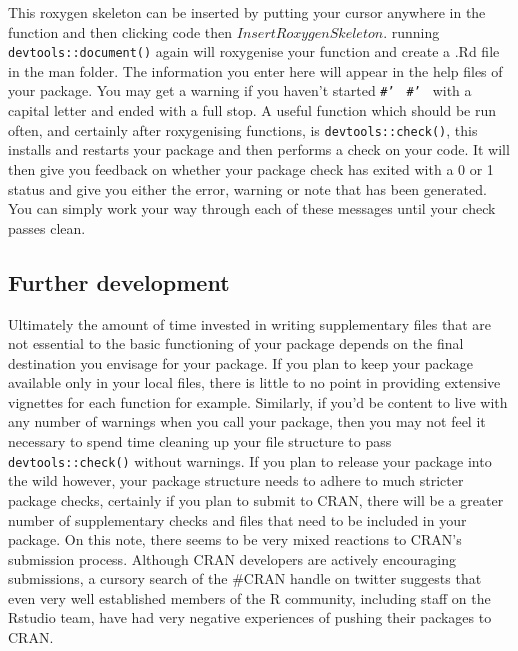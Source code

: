 \documentclass[a4paper,11pt]{article}
\begin{document}
This roxygen skeleton can be inserted by putting your cursor anywhere in the function and then clicking code then  $Insert Roxygen Skeleton $. running \texttt{devtools::document()} again will roxygenise your function and create a .Rd file in the man folder. The information you enter here will appear in the help files of your package. You may get a warning if you haven't started \texttt{\#' \@param} \texttt{\#' \@return} with a capital letter and ended with a full stop. A useful function which should be run often, and certainly after roxygenising functions, is \texttt{devtools::check()}, this installs and restarts your package and then performs a check on your code. It will then give you feedback on whether your package check has exited with a 0 or 1 status and give you either the error, warning or note that has been generated. You can simply work your way through each of these messages until your check passes clean.



\subsection{Further development}

Ultimately the amount of time invested in writing supplementary files that are not essential to the basic functioning of your package depends on the final destination you envisage for your package. If you plan to keep your package available only in your local files, there is little to no point in providing extensive vignettes for each function for example. Similarly, if you'd be content to live with any number of warnings when you call your package, then you may not feel it necessary to spend time cleaning up your file structure to pass \texttt{devtools::check()} without warnings. If you plan to release your package into the wild however, your package structure needs to adhere to much stricter package checks, certainly if you plan to submit to CRAN, there will be a greater number of supplementary checks and files that need to be included in your package. On this note, there seems to be very mixed reactions to CRAN's submission process. Although CRAN developers are actively encouraging submissions, a cursory search of the \#CRAN handle on twitter suggests that even very well established members of the R community, including staff on the Rstudio team, have had very negative experiences of pushing their packages to CRAN.
\end{document}
